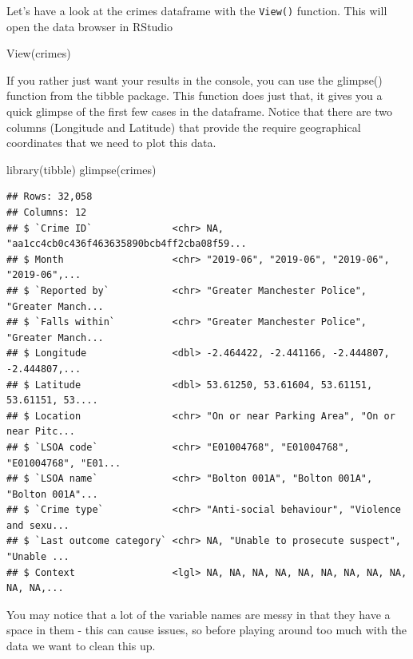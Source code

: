 \documentclass[
]{book}
\newenvironment{Shaded}{\begin{snugshade}}{\end{snugshade}}
\newcommand{\FunctionTok}[1]{\textcolor[rgb]{0.00,0.00,0.00}{#1}}
\newcommand{\NormalTok}[1]{#1}
\begin{document}
Let's have a look at the crimes dataframe with the \texttt{View()} function. This will open the data browser in RStudio

\begin{Shaded}
\begin{Highlighting}[]
\FunctionTok{View}\NormalTok{(crimes)}
\end{Highlighting}
\end{Shaded}

If you rather just want your results in the console, you can use the glimpse() function from the tibble package. This function does just that, it gives you a quick glimpse of the first few cases in the dataframe. Notice that there are two columns (Longitude and Latitude) that provide the require geographical coordinates that we need to plot this data.

\begin{Shaded}
\begin{Highlighting}[]
\FunctionTok{library}\NormalTok{(tibble)}
\FunctionTok{glimpse}\NormalTok{(crimes)}
\end{Highlighting}
\end{Shaded}

\begin{verbatim}
## Rows: 32,058
## Columns: 12
## $ `Crime ID`              <chr> NA, "aa1cc4cb0c436f463635890bcb4ff2cba08f59...
## $ Month                   <chr> "2019-06", "2019-06", "2019-06", "2019-06",...
## $ `Reported by`           <chr> "Greater Manchester Police", "Greater Manch...
## $ `Falls within`          <chr> "Greater Manchester Police", "Greater Manch...
## $ Longitude               <dbl> -2.464422, -2.441166, -2.444807, -2.444807,...
## $ Latitude                <dbl> 53.61250, 53.61604, 53.61151, 53.61151, 53....
## $ Location                <chr> "On or near Parking Area", "On or near Pitc...
## $ `LSOA code`             <chr> "E01004768", "E01004768", "E01004768", "E01...
## $ `LSOA name`             <chr> "Bolton 001A", "Bolton 001A", "Bolton 001A"...
## $ `Crime type`            <chr> "Anti-social behaviour", "Violence and sexu...
## $ `Last outcome category` <chr> NA, "Unable to prosecute suspect", "Unable ...
## $ Context                 <lgl> NA, NA, NA, NA, NA, NA, NA, NA, NA, NA, NA,...
\end{verbatim}

You may notice that a lot of the variable names are messy in that they have a space in them - this can cause issues, so before playing around too much with the data we want to clean this up.
\end{document}

